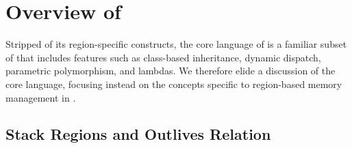 \section{Overview of \name}
\label{sec:overview}

Stripped of its region-specific constructs, the core language of \name
is a familiar subset of \csharp that includes features such as
class-based inheritance, dynamic dispatch, parametric polymorphism,
and lambdas.  We therefore elide a discussion of the core language,
focusing instead on the concepts specific to region-based memory
management in \name.

\subsection{Stack Regions and Outlives Relation}

